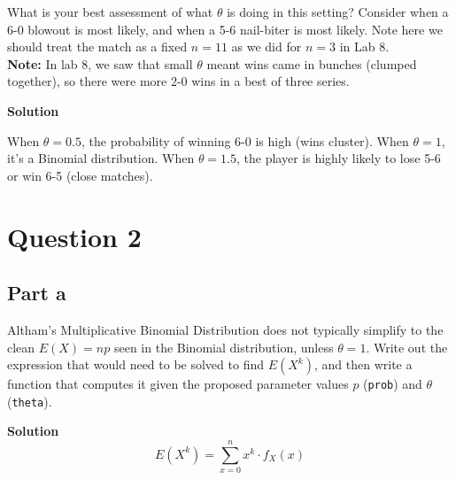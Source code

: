 \documentclass[
]{article}
\begin{document}
What is your best assessment of what \(\theta\) is doing in this
setting? Consider when a 6-0 blowout is most likely, and when a 5-6
nail-biter is most likely. Note here we should treat the match as a
fixed \(n=11\) as we did for \(n=3\) in Lab 8.\\
\textbf{Note:} In lab 8, we saw that small \(\theta\) meant wins came in
bunches (clumped together), so there were more 2-0 wins in a best of
three series.

\textbf{Solution}

When \(\theta=0.5\), the probability of winning 6-0 is high (wins
cluster). When \(\theta=1\), it's a Binomial distribution. When
\(\theta=1.5\), the player is highly likely to lose 5-6 or win 6-5
(close matches).

\section{Question 2}\label{question-2}

\subsection{Part a}\label{part-a-1}

Altham's Multiplicative Binomial Distribution does not typically
simplify to the clean \(E(X)=np\) seen in the Binomial distribution,
unless \(\theta = 1\). Write out the expression that would need to be
solved to find \(E(X^k)\), and then write a function that computes it
given the proposed parameter values \(p\) (\texttt{prob}) and \(\theta\)
(\texttt{theta}).

\textbf{Solution} \[E(X^k) = \sum_{x=0}^{n} x^k \cdot f_X(x)\]

\normalsize
\end{document}
